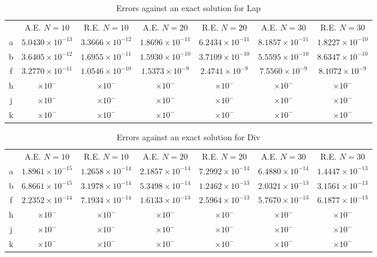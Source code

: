 \documentclass[11pt, a4paper]{article}
\theoremstyle{definition}
\begin{document}
\begin{table}
	\caption{Errors against an exact solution for Lap}
	\begin{tabular}{ ||c| c| c| c| c |c|c|| }
		\hline
		\hline
		& A.E. $N =10$ & R.E. $N =10$ &A.E. $N =20$ & R.E. $N =20$ &A.E. $N =30$ & R.E. $N =30$ \\ 
		a& $5.0430 \times 10^{- 13}$ & $3.3666 \times 10^{-12 }$ & $1.8696 \times 10^{-11 }$ & $ 6.2434\times 10^{- 11}$ &$ 8.1857\times 10^{- 11}$ & $1.8227 \times 10^{- 10}$ \\
		b& $ 3.6405\times 10^{-12 }$ & $ 1.6955\times 10^{- 11}$ & $ 1.5930\times 10^{-10}$ & $ 3.7109\times 10^{- 10}$ &$ 5.5595\times 10^{-10 }$ & $8.6347 \times 10^{-10 }$ \\
		f& $ 3.2770\times 10^{-11 }$ & $ 1.0546\times 10^{-10 }$ & $ 1.5373\times 10^{-9 }$ & $2.4741 \times 10^{- 9}$ &$ 7.5560\times 10^{- 9}$ & $8.1072 \times 10^{-9 }$ \\
		\hline
		h& $ \times 10^{- }$ & $ \times 10^{- }$ & $ \times 10^{- }$ & $ \times 10^{- }$ &$ \times 10^{- }$ & $ \times 10^{- }$ \\
		j& $ \times 10^{- }$ & $ \times 10^{- }$ & $ \times 10^{- }$ & $ \times 10^{- }$ &$ \times 10^{- }$ & $ \times 10^{- }$ \\
		k& $ \times 10^{- }$ & $ \times 10^{- }$ & $ \times 10^{- }$ & $ \times 10^{- }$ &$ \times 10^{- }$ & $ \times 10^{- }$ \\
		\hline
	\end{tabular}
	\label{Tab:Lap}
\end{table}
\begin{table}
	\caption{Errors against an exact solution for Div}
	\begin{tabular}{ ||c| c| c| c| c |c|c|| }
		\hline
		\hline
		& A.E. $N =10$ & R.E. $N =10$ &A.E. $N =20$ & R.E. $N =20$ &A.E. $N =30$ & R.E. $N =30$ \\ 
		a& $  1.8961\times 10^{- 15}$ & $ 1.2658\times 10^{-14 }$ & $2.1857 \times 10^{- 14}$ & $7.2992 \times 10^{-14 }$ &$6.4880 \times 10^{-14 }$ & $1.4447 \times 10^{- 13}$ \\
		b& $ 6.8661\times 10^{-15}$ & $ 3.1978\times 10^{- 14}$ & $ 5.3498\times 10^{-14 }$ & $ 1.2462\times 10^{-13 }$ &$ 2.0321\times 10^{-13 }$ & $3.1561 \times 10^{-13 }$ \\
		f& $ 2.2352\times 10^{-14 }$ & $ 7.1934\times 10^{-14 }$ & $ 1.6133\times 10^{-13 }$ & $ 2.5964\times 10^{-13 }$ &$5.7670 \times 10^{-13 }$ & $ 6.1877\times 10^{- 13}$ \\
		\hline
		h& $ \times 10^{- }$ & $ \times 10^{- }$ & $ \times 10^{- }$ & $ \times 10^{- }$ &$ \times 10^{- }$ & $ \times 10^{- }$ \\
		j& $ \times 10^{- }$ & $ \times 10^{- }$ & $ \times 10^{- }$ & $ \times 10^{- }$ &$ \times 10^{- }$ & $ \times 10^{- }$ \\
		k& $ \times 10^{- }$ & $ \times 10^{- }$ & $ \times 10^{- }$ & $ \times 10^{- }$ &$ \times 10^{- }$ & $ \times 10^{- }$ \\
		\hline
	\end{tabular}
	\label{Tab:div}
\end{table}
\end{document}
